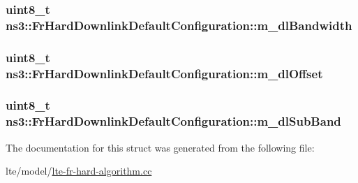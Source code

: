 \subsubsection[{\texorpdfstring{m\+\_\+dl\+Bandwidth}{m_dlBandwidth}}]{\setlength{\rightskip}{0pt plus 5cm}uint8\+\_\+t ns3\+::\+Fr\+Hard\+Downlink\+Default\+Configuration\+::m\+\_\+dl\+Bandwidth}\hypertarget{structns3_1_1FrHardDownlinkDefaultConfiguration_a2566e765f668b22d24370185206ba542}{}\label{structns3_1_1FrHardDownlinkDefaultConfiguration_a2566e765f668b22d24370185206ba542}
\subsubsection[{\texorpdfstring{m\+\_\+dl\+Offset}{m_dlOffset}}]{\setlength{\rightskip}{0pt plus 5cm}uint8\+\_\+t ns3\+::\+Fr\+Hard\+Downlink\+Default\+Configuration\+::m\+\_\+dl\+Offset}\hypertarget{structns3_1_1FrHardDownlinkDefaultConfiguration_a3c9aecd282b15dd191a76c1553a03210}{}\label{structns3_1_1FrHardDownlinkDefaultConfiguration_a3c9aecd282b15dd191a76c1553a03210}
\subsubsection[{\texorpdfstring{m\+\_\+dl\+Sub\+Band}{m_dlSubBand}}]{\setlength{\rightskip}{0pt plus 5cm}uint8\+\_\+t ns3\+::\+Fr\+Hard\+Downlink\+Default\+Configuration\+::m\+\_\+dl\+Sub\+Band}\hypertarget{structns3_1_1FrHardDownlinkDefaultConfiguration_aa112a3923d8d7c0de6f5830dc4e979be}{}\label{structns3_1_1FrHardDownlinkDefaultConfiguration_aa112a3923d8d7c0de6f5830dc4e979be}


The documentation for this struct was generated from the following file\+:\begin{DoxyCompactItemize}
\item 
lte/model/\hyperlink{lte-fr-hard-algorithm_8cc}{lte-\/fr-\/hard-\/algorithm.\+cc}\end{DoxyCompactItemize}
